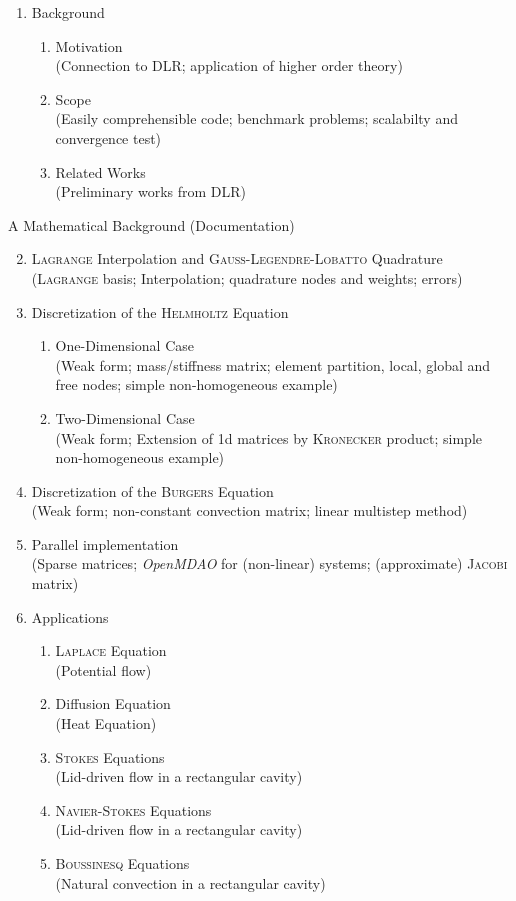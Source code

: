 \documentclass[10pt,a4paper]{article}
\begin{document}
\begin{enumerate}
\item Background
\begin{enumerate}
\item Motivation \\ (Connection to DLR; application of higher order theory)
\item Scope \\ (Easily comprehensible code; benchmark problems; scalabilty and convergence test)
\item Related Works \\ (Preliminary works from DLR)
\end{enumerate}
\end{enumerate}
A Mathematical Background (Documentation)
\begin{enumerate}\setcounter{enumi}{1}
\item \textsc{Lagrange} Interpolation and \textsc{Gauss}-\textsc{Legendre}-\textsc{Lobatto} Quadrature \\ (\textsc{Lagrange} basis; Interpolation; quadrature nodes and weights; errors)
\item Discretization of the \textsc{Helmholtz} Equation
\begin{enumerate}
\item One-Dimensional Case \\ (Weak form; mass/stiffness matrix; element partition, local, global and free nodes; simple non-homogeneous example) 
\item Two-Dimensional Case \\ (Weak form; Extension of 1d matrices by \textsc{Kronecker} product;  simple non-homogeneous example)
\end{enumerate}
\item Discretization of the \textsc{Burgers} Equation \\ (Weak form; non-constant convection matrix; linear multistep method)
\item Parallel implementation \\ (Sparse matrices; \textit{OpenMDAO} for (non-linear) systems; (approximate) \textsc{Jacobi} matrix)
\item Applications
\begin{enumerate}
\item \textsc{Laplace} Equation \\ (Potential flow)
\item Diffusion Equation \\ (Heat Equation)
\item \textsc{Stokes} Equations \\ (Lid-driven flow in a rectangular cavity)
\item \textsc{Navier}-\textsc{Stokes} Equations \\ (Lid-driven flow in a rectangular cavity)
\item \textsc{Boussinesq} Equations \\ (Natural convection in a rectangular cavity)
\end{enumerate}
\end{enumerate}
\end{document}
